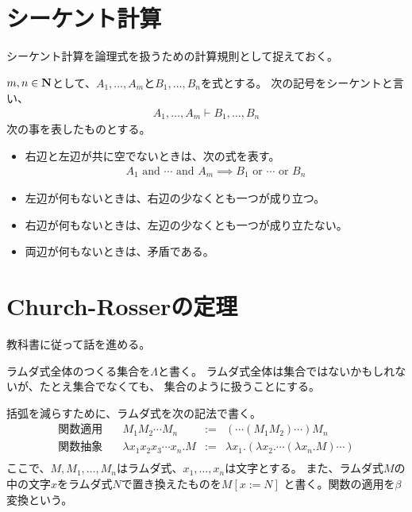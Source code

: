 	{\setlength\arraycolsep{2pt}
\section{シーケント計算}\label{s1:シーケント計算} %
	シーケント計算を論理式を扱うための計算規則として捉えておく。

	\begin{definition}\label{def:シーケント} %
		$m,n\in\mathbf{N}$として、$A_1,\dots,A_m$と$B_1,\dots,B_n$を式とする。
		次の記号をシーケントと言い、
		\begin{equation*}\begin{split}
			A_1,\dots,A_m\vdash B_1,\dots,B_n 
		\end{split}\end{equation*}
		次の事を表したものとする。
		\begin{itemize}\setlength{\itemsep}{-1mm} %
			\item 右辺と左辺が共に空でないときは、次の式を表す。
			\begin{equation*}\begin{split}
				A_1\text{ and }\cdots\text{ and } A_m
				\implies B_1\text{ or }\cdots\text{ or } B_n
			\end{split}\end{equation*}
			\item 左辺が何もないときは、右辺の少なくとも一つが成り立つ。
			\item 右辺が何もないときは、左辺の少なくとも一つが成り立たない。
			\item 両辺が何もないときは、矛盾である。
		\end{itemize} %
	\end{definition} %
\section{Church-Rosserの定理}\label{s1:Church-Rosserの定理} %
	教科書\cite{takahashi:keisan}に従って話を進める。

	ラムダ式全体のつくる集合を$\Lambda$と書く。
	ラムダ式全体は集合ではないかもしれないが、たとえ集合でなくても、
	集合のように扱うことにする。

	括弧を減らすために、ラムダ式を次の記法で書く。
	\begin{equation*}\begin{array}{lrcll}
		\text{関数適用}\quad 
			& M_1M_2\cdots M_n &:=& (\cdots(M_1M_2)\cdots)M_n \\
		\text{関数抽象}\quad 
			& \lambda x_1x_2x_3\cdots x_n.M 
			&:=& \lambda x_1.(\lambda x_2.\cdots (\lambda x_n.M)\cdots) \\
	\end{array}\end{equation*}
	ここで、$M,M_1,\dots,M_n$はラムダ式、$x_1,\dots,x_n$は文字とする。
	また、ラムダ式$M$の中の文字$x$をラムダ式$N$で置き換えたものを$M[x:=N]$
	と書く。関数の適用を$\beta$変換という。

}
